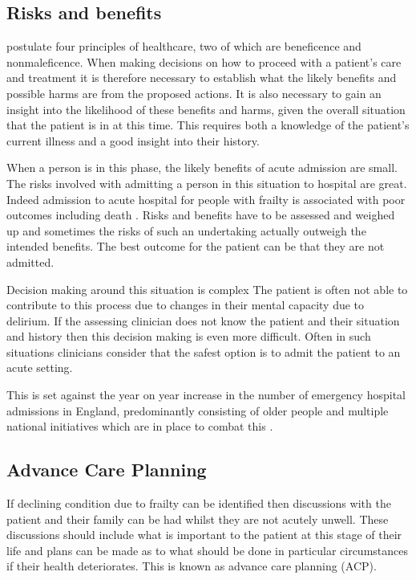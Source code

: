 \documentclass
[
	12pt,
	a4paper,
	oneside,
]{report}
\begin{document}
\subsection{Risks and benefits}
\label{sec:risk-ben}

\textcite{beauchampChildress:01} postulate four principles of healthcare, two
of which are beneficence and nonmaleficence.
When making decisions on how to proceed with a patient's care and treatment
it is therefore necessary to establish what the likely benefits and possible 
harms are from the proposed actions. It is also necessary to gain an insight 
into the likelihood of these benefits and harms, given the overall situation that
the patient is in at this time. This requires both a knowledge of the patient's 
current illness and a good insight into their history.

When a person is in this phase, the likely benefits of acute admission are small.
The risks involved with admitting a person in this situation
to hospital are great.  
Indeed admission to acute hospital for people with frailty is associated with
poor outcomes including death \parencite{silver:12, wallis:15}. Risks and 
benefits have to be assessed and 
weighed up and sometimes the risks of such an undertaking actually
outweigh the intended benefits. The best outcome for the patient can be that 
they are not admitted. 

Decision making around this situation is complex 
The patient is often not able to contribute to this process due to changes in their
mental capacity due to delirium. If the assessing clinician does not know the 
patient and their situation and history then this decision making is even more 
difficult. Often in such situations clinicians consider that the safest option is to 
admit the patient to an acute setting.

This is set against the year on year increase in the number of emergency hospital 
admissions in England, predominantly consisting of older people and multiple 
national initiatives which are in place to combat this \parencite{nao:18}.

\subsection{Advance Care Planning}

If declining condition due to frailty can be identified then discussions with the 
patient and their family can be had whilst they are not acutely unwell. These 
discussions should include what is important to the patient at this stage of their
life and plans can be made as to what should be done in particular circumstances
if their health deteriorates. This is known as advance care planning (ACP).
\end{document}
